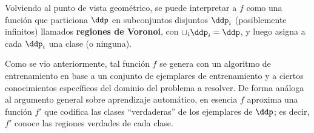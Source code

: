 Volviendo al punto de vista geométrico, se puede interpretar a $f$ como una función que particiona $\ddp$ en subconjuntos disjuntos $\ddp_i$ (posiblemente infinitos) llamados \textbf{regiones de Voronoi}, con $\cup_{i} \ddp_i = \ddp$, y luego asigna a cada $\ddp_i$ una clase (o ninguna). 


Como se vio anteriormente, tal función $f$ se genera con un algoritmo de entrenamiento en base a un conjunto de ejemplares de entrenamiento y a ciertos conocimientos específicos del dominio del problema a resolver. De forma análoga al argumento general sobre aprendizaje automático, en esencia $f$ aproxima una función $f'$ que codifica las clases ``verdaderas'' de los ejemplares de $\ddp$; es decir, $f'$ conoce las regiones verdades de cada clase.

